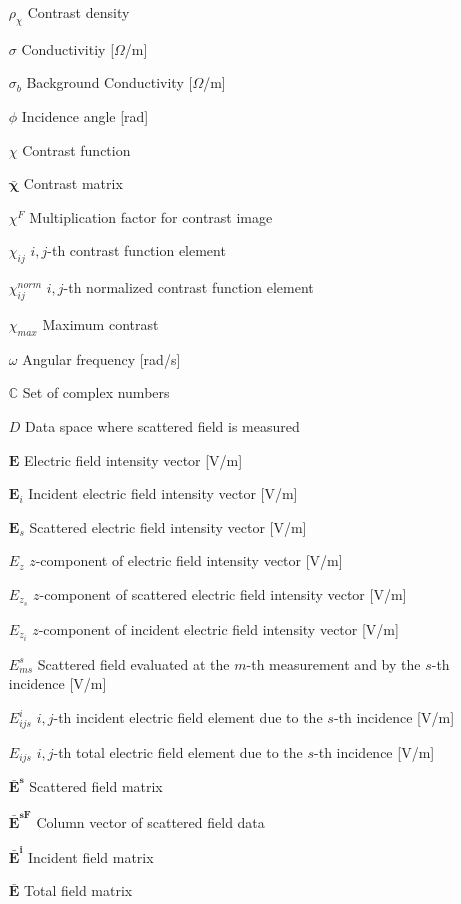 \begin{itemize}[labelwidth=4em,leftmargin=\dimexpr{}+\relax,align=left]
			\item[$\rho_{\chi}$] Contrast density
			\item[$\sigma$] Conductivitiy [$\Omega$/m]
			\item[$\sigma_b$] Background Conductivity [$\Omega$/m]
			\item[$\phi$] Incidence angle [rad]
			\item[$\chi$] Contrast function
			\item[$\boldsymbol{\bar{\chi}}$] Contrast matrix
			\item[$\chi^F$] Multiplication factor for contrast image
			\item[$\chi_{ij}$] $i,j$-th contrast function element
			\item[$\chi_{ij}^{norm}$] $i,j$-th normalized contrast function element 
			\item[$\chi_{max}$] Maximum contrast
			\item[$\omega$] Angular frequency [rad/s]
			\item[$\mathbb{C}$] Set of complex numbers
			\item[$D$] Data space where scattered field is measured
			\item[$\mathbf{E}$] Electric field intensity vector [V/m]
			\item[$\mathbf{E}_i$] Incident electric field intensity vector [V/m]
			\item[$\mathbf{E}_s$] Scattered electric field intensity vector [V/m]
			\item[$E_z$] $z$-component of electric field intensity vector [V/m]
			\item[$E_{z_s}$] $z$-component of scattered electric field intensity vector [V/m]
			\item[$E_{z_i}$] $z$-component of incident electric field intensity vector [V/m]
			\item[$E^s_{ms}$] Scattered field evaluated at the $m$-th measurement and by the $s$-th incidence [V/m]
			\item[$E^i_{ijs}$] $i,j$-th incident electric field element due to the $s$-th incidence [V/m]
			\item[$E_{ijs}$] $i,j$-th total electric field element due to the $s$-th incidence [V/m]
			\item[$\mathbf{\bar{E}^s}$] Scattered field matrix
			\item[$\mathbf{\bar{E}^{sF}}$] Column vector of scattered field data
			\item[$\mathbf{\bar{E}^i}$] Incident field matrix
			\item[$\mathbf{\bar{E}}$] Total field matrix

\end{itemize}
